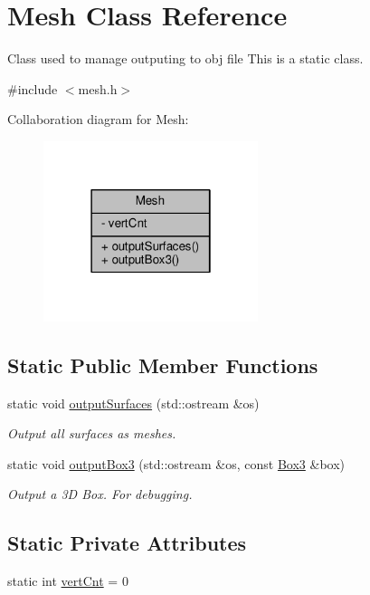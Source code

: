 \hypertarget{classMesh}{}\section{Mesh Class Reference}
\label{classMesh}


Class used to manage outputing to obj file This is a static class.  




{\ttfamily \#include $<$mesh.\+h$>$}



Collaboration diagram for Mesh\+:
\nopagebreak
\begin{figure}[H]
\begin{center}
\leavevmode
\includegraphics[width=178pt]{classMesh__coll__graph}
\end{center}
\end{figure}
\subsection*{Static Public Member Functions}
\begin{DoxyCompactItemize}
\item 
static void \hyperlink{classMesh_a054505fe7c3b40ff3d822ecf8b43a156}{output\+Surfaces} (std\+::ostream \&os)
\begin{DoxyCompactList}\small\item\em Output all surfaces as meshes. \end{DoxyCompactList}\item 
static void \hyperlink{classMesh_aae0fa0f7959e6dc362025e3d0ade76b7}{output\+Box3} (std\+::ostream \&os, const \hyperlink{structBox3}{Box3} \&box)
\begin{DoxyCompactList}\small\item\em Output a 3D Box. For debugging. \end{DoxyCompactList}\end{DoxyCompactItemize}
\subsection*{Static Private Attributes}
\begin{DoxyCompactItemize}
\item 
static int \hyperlink{classMesh_a4d39ee3e6f94b387fa5b611e4acdf492}{vert\+Cnt} = 0
\end{DoxyCompactItemize}


